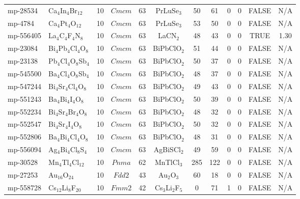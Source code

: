 {\begin{longtable}{llcccccccccc}
    mp-28534 & Ca$_{4}$In$_{4}$Br$_{12}$ & 10    & $Cmcm$ & 63    & PrLuSe$_{3}$ & 50    & 61    & 0     & 0     & FALSE & N/A \\
    mp-4784 & Ca$_{4}$Pt$_{4}$O$_{12}$ & 10    & $Cmcm$ & 63    & PrLuSe$_{3}$ & 53    & 50    & 0     & 0     & FALSE & N/A \\
    mp-556405 & La$_{4}$C$_{4}$F$_{4}$N$_{8}$ & 10    & $Cmcm$ & 63    & LaCN$_{2}$ & 48    & 43    & 0     & 0     & TRUE  & 1.30  \\
    mp-23084 & Bi$_{4}$Pb$_{4}$Cl$_{4}$O$_{8}$ & 10    & $Cmcm$ & 63    & BiPbClO$_{2}$ & 51    & 44    & 0     & 0     & FALSE & N/A \\
    mp-23138 & Pb$_{4}$Cl$_{4}$O$_{8}$Sb$_{4}$ & 10    & $Cmcm$ & 63    & BiPbClO$_{2}$ & 50    & 37    & 0     & 0     & FALSE & N/A \\
    mp-545500 & Ba$_{4}$Cl$_{4}$O$_{8}$Sb$_{4}$ & 10    & $Cmcm$ & 63    & BiPbClO$_{2}$ & 48    & 37    & 0     & 0     & FALSE & N/A \\
    mp-547244 & Bi$_{4}$Sr$_{4}$Cl$_{4}$O$_{8}$ & 10    & $Cmcm$ & 63    & BiPbClO$_{2}$ & 49    & 43    & 0     & 0     & FALSE & N/A \\
    mp-551243 & Ba$_{4}$Bi$_{4}$I$_{4}$O$_{8}$ & 10    & $Cmcm$ & 63    & BiPbClO$_{2}$ & 50    & 39    & 0     & 0     & FALSE & N/A \\
    mp-552234 & Bi$_{4}$Sr$_{4}$Br$_{4}$O$_{8}$ & 10    & $Cmcm$ & 63    & BiPbClO$_{2}$ & 48    & 32    & 0     & 0     & FALSE & N/A \\
    mp-552547 & Bi$_{4}$Sr$_{4}$I$_{4}$O$_{8}$ & 10    & $Cmcm$ & 63    & BiPbClO$_{2}$ & 50    & 32    & 0     & 0     & FALSE & N/A \\
    mp-552806 & Ba$_{4}$Bi$_{4}$Cl$_{4}$O$_{8}$ & 10    & $Cmcm$ & 63    & BiPbClO$_{2}$ & 48    & 31    & 0     & 0     & FALSE & N/A \\
    mp-556094 & Ag$_{4}$Bi$_{4}$Cl$_{8}$S$_{4}$ & 10    & $Cmcm$ & 63    & AgBiSCl$_{2}$ & 49    & 59    & 0     & 0     & FALSE & N/A \\
    mp-30528 & Mn$_{4}$Tl$_{4}$Cl$_{12}$ & 10    & $Pnma$ & 62    & MnTlCl$_{3}$ & 285   & 122   & 0     & 0     & FALSE & N/A \\
    mp-27253 & Au$_{16}$O$_{24}$ & 10    & $Fdd2$ & 43    & Au$_{2}$O$_{3}$ & 60    & 18    & 0     & 0     & FALSE & N/A \\
    mp-558728 & Cs$_{12}$Li$_{8}$F$_{20}$ & 10    & $Fmm2$ & 42    & Cs$_{3}$Li$_{2}$F$_{5}$ & 0     & 71    & 1     & 0     & FALSE & N/A \\

\end{longtable}}
